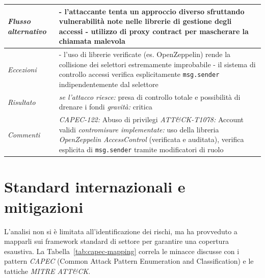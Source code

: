 \begin{longtable}{| >{\columncolor{abuseCol}}p{} | p{} |}
\hline
\textit{Flusso alternativo} & - l'attaccante tenta un approccio diverso sfruttando vulnerabilità note nelle librerie di gestione degli accessi \newline - utilizzo di proxy contract per mascherare la chiamata malevola \\
\hline
\textit{Eccezioni} & - l'uso di librerie verificate (es. OpenZeppelin) rende la collisione dei selettori estremamente improbabile \newline - il sistema di controllo accessi verifica esplicitamente \texttt{msg.sender} indipendentemente dal selettore \\
\hline
\textit{Risultato} & \textit{se l'attacco riesce:} presa di controllo totale e possibilità di drenare i fondi \newline \textit{gravità:} critica \\
\hline
\textit{Commenti} & \textit{CAPEC-122:} Abuso di privilegi \newline \textit{ATT\&CK-T1078:} Account validi \newline \textit{contromisure implementate:} uso della libreria \textit{OpenZeppelin AccessControl} (verificata e auditata), verifica esplicita di \texttt{msg.sender} tramite modificatori di ruolo \\
\hline
\end{longtable}

\section{Standard internazionali e mitigazioni}
L'analisi non si è limitata all'identificazione dei rischi, ma ha provveduto a mapparli sui framework standard di settore per garantire una copertura esaustiva. La Tabella~\ref{tab:capec-mapping} correla le minacce discusse con i pattern \textit{CAPEC} (Common Attack Pattern Enumeration and Classification) e le tattiche \textit{MITRE ATT\&CK}.

